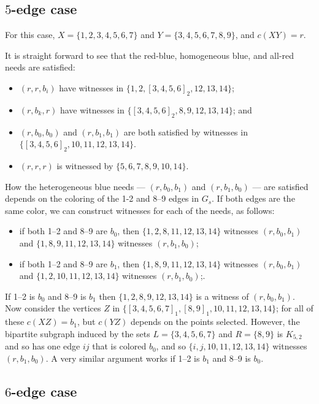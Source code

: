 \documentclass{article}
\theoremstyle{definition}
\begin{document}
\subsection{$5$-edge case}

For this case, $X = \{1,2,3,4,5,6,7\}$ and $Y = \{3,4,5,6,7,8,9\}$, and $c(XY)
= r$.

It is straight forward to see that the red-blue, homogeneous blue, and all-red needs are
satisfied:
\begin{itemize}
\item $(r,r,b_{i})$ have witnesses in $\{1,2,[3,4,5,6]_{2},12,13,14\}$;
\item $(r,b_{k},r)$ have witnesses in $\{[3,4,5,6]_{2},8,9,12,13,14\}$; and
\item $(r,b_{0},b_{0})$ and $(r,b_{1},b_{1})$ are both satisfied by witnesses
  in $\{[3,4,5,6]_{2},10,11,12,13,14\}$.
\item $(r,r,r)$ is witnessed by $\{5,6,7,8,9,10,14\}$.
\end{itemize}

How the heterogeneous blue needs --- $(r,b_{0},b_{1})$ and $(r,b_{1},b_{0})$ ---
are satisfied depends on the coloring of the 1-2 and 8--9 edges in $G_{s}$.
If both edges are the same color, we can construct witnesses for each of the
needs, as follows:
\begin{itemize}
\item if both 1--2 and 8--9 are $b_{0}$, then $\{1,2,8,11,12,13,14\}$
  witnesses $(r,b_{0},b_{1})$ and $\{1,8,9,11,12,13,14\}$ witnesses $(r,b_{1},b_{0})$;
\item if both 1--2 and 8--9 are $b_{1}$, then $\{1,8,9,11,12,13,14\}$
  witnesses $(r,b_{0},b_{1})$ and $\{1,2,10,11,12,13,14\}$ witnesses $(r,b_{1},b_{0})$;.
\end{itemize}

If 1--2 is $b_{0}$ and 8--9 is $b_{1}$ then $\{1,2,8,9,12,13,14\}$ is a
witness of $(r,b_{0},b_{1})$. Now consider the vertices $Z$ in
$\{[3,4,5,6,7]_{1}, [8,9]_{1}, 10, 11, 12, 13, 14\}$; for all of these $c(XZ) = b_{1}$, but
$c(YZ)$ depends on the points selected. However, the bipartite subgraph
induced by the sets $L=\{3,4,5,6,7\}$ and $R=\{8,9\}$ is $K_{5,2}$ and so has
one edge $ij$ that is colored $b_{0}$, and so $\{i,j,10,11,12,13,14\}$
witnesses $(r,b_{1},b_{0})$. A very similar argument works if 1--2 is $b_{1}$
and 8--9 is $b_{0}$.

\subsection{$6$-edge case}
\end{document}
